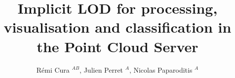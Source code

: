 
	
 
\title{ Implicit LOD for processing, visualisation and classification in the Point Cloud Server} 
\author{Rémi Cura  $^{AB}$, Julien Perret $^A$, Nicolas Paparoditis  $^A$}
\address{ $^A$  Universite Paris-Est, IGN, SRIG, COGIT \& MATIS, 73 avenue de Paris, 94160 Saint Mande, France\\
	first\_name.last\_name@ign.fr
	\\$^B$  Thales Training \& Simulation SAS, 1 rue du Général de Gaulle 95523 Cergy-Pontoise, France}






\maketitle 
	

